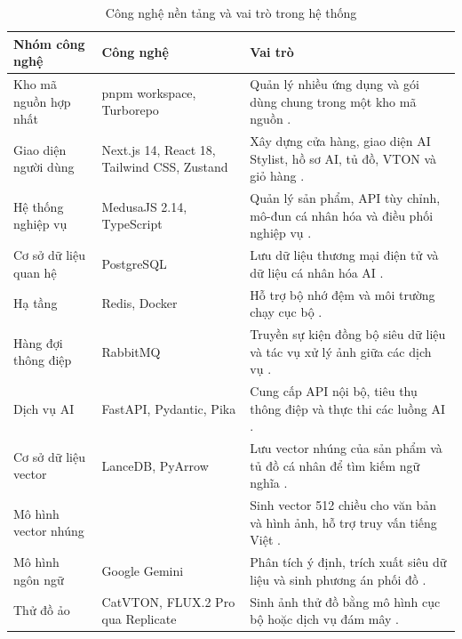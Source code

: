 \begin{table}[H]
\centering
\small
\caption{Công nghệ nền tảng và vai trò trong hệ thống}
\label{tab:technology-stack}
\begin{tabularx}{\textwidth}{L{2.8cm}L{3.6cm}Y}
\toprule
\textbf{Nhóm công nghệ} & \textbf{Công nghệ} & \textbf{Vai trò} \\
\midrule
Kho mã nguồn hợp nhất & pnpm workspace, Turborepo & Quản lý nhiều ứng dụng và gói dùng chung trong một kho mã nguồn \cite{pnpm,turborepo}. \\
\addlinespace
Giao diện người dùng & Next.js 14, React 18, Tailwind CSS, Zustand & Xây dựng cửa hàng, giao diện AI Stylist, hồ sơ AI, tủ đồ, VTON và giỏ hàng \cite{nextjs,react,tailwind,zustand}. \\
\addlinespace
Hệ thống nghiệp vụ & MedusaJS 2.14, TypeScript & Quản lý sản phẩm, API tùy chỉnh, mô-đun cá nhân hóa và điều phối nghiệp vụ \cite{medusa}. \\
\addlinespace
Cơ sở dữ liệu quan hệ & PostgreSQL & Lưu dữ liệu thương mại điện tử và dữ liệu cá nhân hóa AI \cite{postgresql}. \\
\addlinespace
Hạ tầng & Redis, Docker & Hỗ trợ bộ nhớ đệm và môi trường chạy cục bộ \cite{redis,docker}. \\
\addlinespace
Hàng đợi thông điệp & RabbitMQ & Truyền sự kiện đồng bộ siêu dữ liệu và tác vụ xử lý ảnh giữa các dịch vụ \cite{rabbitmq}. \\
\addlinespace
Dịch vụ AI & FastAPI, Pydantic, Pika & Cung cấp API nội bộ, tiêu thụ thông điệp và thực thi các luồng AI \cite{fastapi}. \\
\addlinespace
Cơ sở dữ liệu vector & LanceDB, PyArrow & Lưu vector nhúng của sản phẩm và tủ đồ cá nhân để tìm kiếm ngữ nghĩa \cite{lancedb}. \\
\addlinespace
Mô hình vector nhúng & \allowbreak{} & Sinh vector 512 chiều cho văn bản và hình ảnh, hỗ trợ truy vấn tiếng Việt \cite{sentence-transformers}. \\
\addlinespace
Mô hình ngôn ngữ & Google Gemini & Phân tích ý định, trích xuất siêu dữ liệu và sinh phương án phối đồ \cite{gemini}. \\
\addlinespace
Thử đồ ảo & CatVTON, FLUX.2 Pro qua Replicate & Sinh ảnh thử đồ bằng mô hình cục bộ hoặc dịch vụ đám mây \cite{catvton,replicate}. \\
\bottomrule
\end{tabularx}
\end{table}

\clearpage
